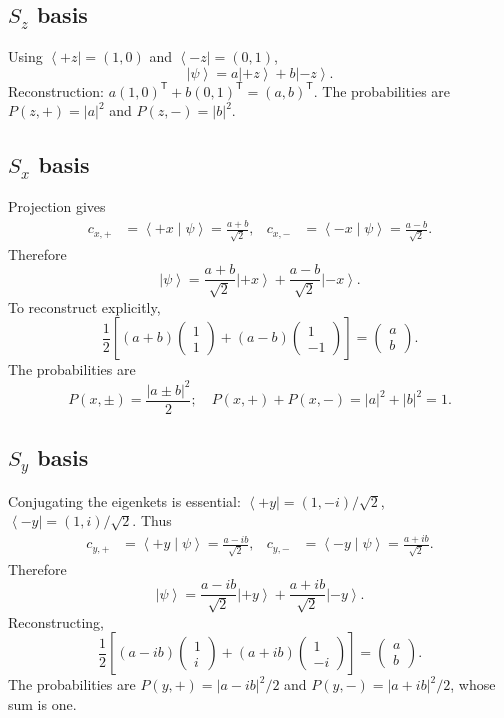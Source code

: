\documentclass[11pt,a4paper]{article}
\theoremstyle{definition}
\newcommand{\ket}[1]{\left|#1\right\rangle}
\newcommand{\bra}[1]{\left\langle#1\right|}
\newcommand{\ip}[2]{\left\langle#1\middle|#2\right\rangle}
\begin{document}
\subsection{\(S_z\) basis}
Using \(\bra{+z}=(1,0)\) and \(\bra{-z}=(0,1)\),
\begin{equation}
\boxed{\ket\psi=a\ket{+z}+b\ket{-z}.}
\end{equation}
Reconstruction: \(a(1,0)^{\mathsf T}+b(0,1)^{\mathsf T}=(a,b)^{\mathsf T}\). The probabilities are \(P(z,+)=|a|^2\) and \(P(z,-)=|b|^2\).
\subsection{\(S_x\) basis}
Projection gives
\begin{align}
c_{x,+}&=\ip{+x}{\psi}=\frac{a+b}{\sqrt2},&
c_{x,-}&=\ip{-x}{\psi}=\frac{a-b}{\sqrt2}.
\end{align}
Therefore
\begin{equation}
\boxed{\ket\psi=\frac{a+b}{\sqrt2}\ket{+x}+\frac{a-b}{\sqrt2}\ket{-x}.}
\end{equation}
To reconstruct explicitly,
\begin{equation}
\frac12\left[(a+b)\begin{pmatrix}1\\1\end{pmatrix}+(a-b)\begin{pmatrix}1\\-1\end{pmatrix}\right]
=\begin{pmatrix}a\\b\end{pmatrix}.
\end{equation}
The probabilities are
\begin{equation}
\boxed{P(x,\pm)=\frac{|a\pm b|^2}{2};\quad P(x,+)+P(x,-)=|a|^2+|b|^2=1.}
\end{equation}
\subsection{\(S_y\) basis}
Conjugating the eigenkets is essential: \(\bra{+y}=(1,-i)/\sqrt2\), \(\bra{-y}=(1,i)/\sqrt2\). Thus
\begin{align}
c_{y,+}&=\ip{+y}{\psi}=\frac{a-ib}{\sqrt2},&
c_{y,-}&=\ip{-y}{\psi}=\frac{a+ib}{\sqrt2}.
\end{align}
Therefore
\begin{equation}
\boxed{\ket\psi=\frac{a-ib}{\sqrt2}\ket{+y}+\frac{a+ib}{\sqrt2}\ket{-y}.}
\end{equation}
Reconstructing,
\begin{equation}
\frac12\left[(a-ib)\begin{pmatrix}1\\i\end{pmatrix}+(a+ib)\begin{pmatrix}1\\-i\end{pmatrix}\right]
=\begin{pmatrix}a\\b\end{pmatrix}.
\end{equation}
The probabilities are \(P(y,+)=|a-ib|^2/2\) and \(P(y,-)=|a+ib|^2/2\), whose sum is one.
\end{document}
